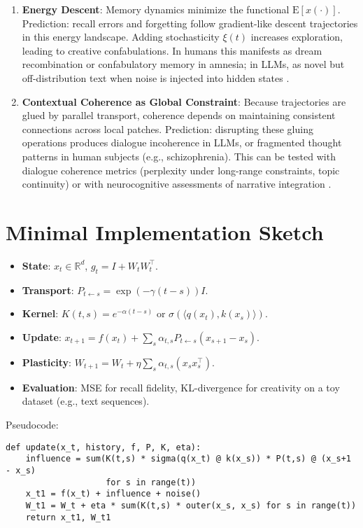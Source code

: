 \documentclass[a4paper,12pt]{article}
\newcommand{\E}{\mathrm{E}}
\begin{document}
\begin{enumerate}
    \item \textbf{Energy Descent}: 
    Memory dynamics minimize the functional $\E[x(\cdot)]$. 
    Prediction: recall errors and forgetting follow gradient-like descent trajectories
    in this energy landscape. Adding stochasticity $\xi(t)$ increases exploration,
    leading to creative confabulations. In humans this manifests as dream recombination
    or confabulatory memory in amnesia; in LLMs, as novel but off-distribution text
    when noise is injected into hidden states \citep{friston2010free}.

    \item \textbf{Contextual Coherence as Global Constraint}: 
    Because trajectories are glued by parallel transport, coherence depends on
    maintaining consistent connections across local patches. 
    Prediction: disrupting these gluing operations produces dialogue incoherence
    in LLMs, or fragmented thought patterns in human subjects (e.g., schizophrenia).
    This can be tested with dialogue coherence metrics (perplexity under long-range
    constraints, topic continuity) or with neurocognitive assessments of narrative 
    integration \citep{squire1992memory}.
\end{enumerate}

\section{Minimal Implementation Sketch}
\begin{itemize}
    \item \textbf{State}: $x_t \in \mathbb{R}^d$, $g_t = I + W_t W_t^\top$.
    \item \textbf{Transport}: $P_{t \leftarrow s} = \exp(-\gamma (t-s)) I$.
    \item \textbf{Kernel}: $K(t,s) = e^{-\alpha (t-s)}$ or $\sigma(\langle q(x_t), k(x_s) \rangle)$.
    \item \textbf{Update}: $x_{t+1} = f(x_t) + \sum_s \alpha_{t,s} P_{t \leftarrow s} (x_{s+1} - x_s)$.
    \item \textbf{Plasticity}: $W_{t+1} = W_t + \eta \sum_s \alpha_{t,s} (x_s x_s^\top)$.
    \item \textbf{Evaluation}: MSE for recall fidelity, KL-divergence for creativity on a toy dataset (e.g., text sequences).
\end{itemize}
Pseudocode:
\begin{verbatim}
def update(x_t, history, f, P, K, eta):
    influence = sum(K(t,s) * sigma(q(x_t) @ k(x_s)) * P(t,s) @ (x_s+1 - x_s) 
                    for s in range(t))
    x_t1 = f(x_t) + influence + noise()
    W_t1 = W_t + eta * sum(K(t,s) * outer(x_s, x_s) for s in range(t))
    return x_t1, W_t1
\end{verbatim}
\end{document}
